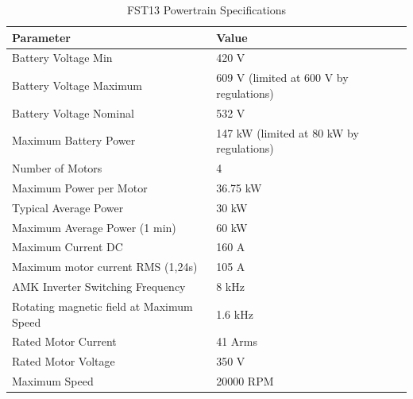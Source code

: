 \begin{table}[h]
	\centering
	\caption{FST13 Powertrain Specifications}
	\label{table:fst13_specs}%
	\renewcommand{\arraystretch}{1.2} %
		\begin{tabular}{l l}
			\toprule
			\textbf{Parameter}                 & \textbf{Value} \\ \toprule
			Battery Voltage Min                & 420 V          \\ \hline
			Battery Voltage Maximum            & 609 V (limited at 600 V by regulations)          \\ \hline
			Battery Voltage Nominal            & 532 V          \\ \hline
			Maximum Battery Power                      & 147 kW (limited at 80 kW by regulations)          \\ \hline
			Number of Motors                   & 4              \\ \hline
			Maximum Power per Motor            & 36.75 kW       \\ \hline
			Typical Average Power              & 30 kW          \\ \hline
			Maximum Average Power (1 min)      & 60 kW          \\ \hline
			Maximum Current DC                 & 160 A          \\ \hline
			Maximum motor current RMS (1,24s)  & 105 A          \\ \hline
			AMK Inverter Switching Frequency   & 8 kHz          \\ \hline
			Rotating magnetic field at Maximum Speed   & 1.6 kHz        \\ \hline
			Rated Motor Current                & 41 Arms        \\ \hline
			Rated Motor Voltage                & 350 V          \\ \hline
			Maximum Speed                      & 20000 RPM      \\ \hline

\end{tabular}
\end{table}
